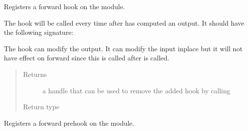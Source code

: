 \documentclass[letterpaper,10pt,english]{sphinxmanual}
\begin{document}
\begin{fulllineitems}

\begin{fulllineitems}
\label{\detokenize{api/autoencoding:geology.metamodelling.SpatialAutoencoder.register_forward_hook}}
Registers a forward hook on the module.

The hook will be called every time after {\hyperref[\detokenize{api/autoencoding:geology.metamodelling.SpatialAutoencoder.forward}]{}} has computed an output.
It should have the following signature:

\begin{sphinxVerbatim}[commandchars=\\\{\}]
       
\end{sphinxVerbatim}

The hook can modify the output. It can modify the input inplace but
it will not have effect on forward since this is called after
{\hyperref[\detokenize{api/autoencoding:geology.metamodelling.SpatialAutoencoder.forward}]{}} is called.
\begin{quote}\begin{description}
\item[{Returns}] \leavevmode
a handle that can be used to remove the added hook by calling

\item[{Return type}] \leavevmode
{}

\end{description}\end{quote}

\end{fulllineitems}


\begin{fulllineitems}
\label{\detokenize{api/autoencoding:geology.metamodelling.SpatialAutoencoder.register_forward_pre_hook}}
Registers a forward pre\sphinxhyphen{}hook on the module.


\end{fulllineitems}
\end{fulllineitems}
\end{document}

